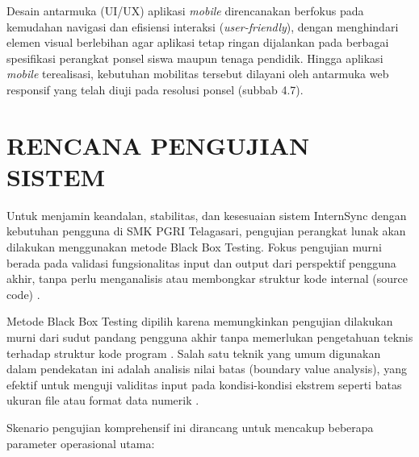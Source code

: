 Desain antarmuka (UI/UX) aplikasi \textit{mobile} direncanakan berfokus pada kemudahan navigasi dan efisiensi interaksi (\textit{user-friendly}), dengan menghindari elemen visual berlebihan agar aplikasi tetap ringan dijalankan pada berbagai spesifikasi perangkat ponsel siswa maupun tenaga pendidik. Hingga aplikasi \textit{mobile} terealisasi, kebutuhan mobilitas tersebut dilayani oleh antarmuka web responsif yang telah diuji pada resolusi ponsel (subbab 4.7).

\section{RENCANA PENGUJIAN SISTEM}

Untuk menjamin keandalan, stabilitas, dan kesesuaian sistem InternSync dengan kebutuhan pengguna di SMK PGRI Telagasari, pengujian perangkat lunak akan dilakukan menggunakan metode Black Box Testing. Fokus pengujian murni berada pada validasi fungsionalitas input dan output dari perspektif pengguna akhir, tanpa perlu menganalisis atau membongkar struktur kode internal (source code) \cite{ref18}.

Metode Black Box Testing dipilih karena memungkinkan pengujian dilakukan murni dari sudut pandang pengguna akhir tanpa memerlukan pengetahuan teknis terhadap struktur kode program \cite{ref19}. Salah satu teknik yang umum digunakan dalam pendekatan ini adalah analisis nilai batas (boundary value analysis), yang efektif untuk menguji validitas input pada kondisi-kondisi ekstrem seperti batas ukuran file atau format data numerik \cite{ref20}.

Skenario pengujian komprehensif ini dirancang untuk mencakup beberapa parameter operasional utama:

